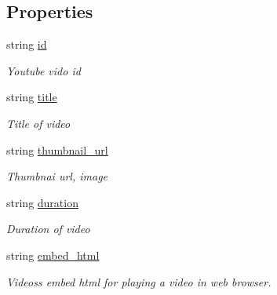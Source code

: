\subsection*{Properties}
\begin{DoxyCompactItemize}
\item 
string \mbox{\hyperlink{struct_you_tube_tracker_1_1_video_data_a82645a050c3eb08fa1a69fbaaf80a149}{id}}
\begin{DoxyCompactList}\small\item\em Youtube vido id \end{DoxyCompactList}\item 
string \mbox{\hyperlink{struct_you_tube_tracker_1_1_video_data_a27e67b8b39d459a7fb2107ab4ef7fdd7}{title}}
\begin{DoxyCompactList}\small\item\em Title of video \end{DoxyCompactList}\item 
string \mbox{\hyperlink{struct_you_tube_tracker_1_1_video_data_a2e068777a3633b83e7300d84d8a1d3e3}{thumbnail\+\_\+url}}
\begin{DoxyCompactList}\small\item\em Thumbnai url, image \end{DoxyCompactList}\item 
string \mbox{\hyperlink{struct_you_tube_tracker_1_1_video_data_a77293a0d3f3fde7099a415f488d96885}{duration}}
\begin{DoxyCompactList}\small\item\em Duration of video \end{DoxyCompactList}\item 
string \mbox{\hyperlink{struct_you_tube_tracker_1_1_video_data_ae6fbc40e0ecdce522c2a65f68fba43c9}{embed\+\_\+html}}
\begin{DoxyCompactList}\small\item\em Videos\textquotesingle{}s embed html for playing a video in web browser. \end{DoxyCompactList}\end{DoxyCompactItemize}


